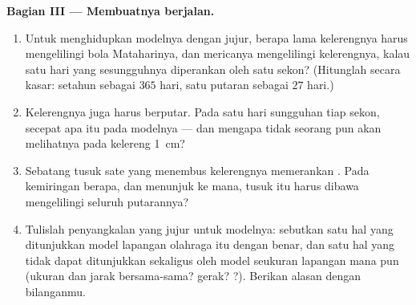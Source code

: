 \begin{problem}
\medskip\noindent\textbf{Bagian III --- Membuatnya berjalan.}
\begin{enumerate}[resume]
  \item Untuk menghidupkan modelnya dengan jujur, berapa lama
        kelerengnya harus mengelilingi bola Mataharinya, dan
        mericanya mengelilingi kelerengnya, kalau satu hari yang
        sesungguhnya diperankan oleh satu sekon? (Hitunglah secara
        kasar: setahun sebagai $365$ hari, satu putaran 
        sebagai $27$ hari.)
  \item Kelerengnya juga harus berputar. Pada satu hari sungguhan
        tiap sekon, secepat apa itu pada modelnya --- dan mengapa
        tidak seorang pun akan melihatnya pada kelereng \qty{1}{cm}?
  \item Sebatang tusuk sate yang menembus kelerengnya memerankan
        . Pada kemiringan berapa, dan menunjuk ke mana,
        tusuk itu harus dibawa mengelilingi seluruh putarannya?
  \item Tulislah penyangkalan yang jujur untuk modelnya: sebutkan
        satu hal yang ditunjukkan model lapangan olahraga itu dengan
        benar, dan satu hal yang tidak dapat ditunjukkan sekaligus
        oleh model seukuran lapangan mana pun (ukuran dan jarak
        bersama-sama? gerak? ?). Berikan alasan dengan
        bilanganmu.
\end{enumerate}
\end{problem}
